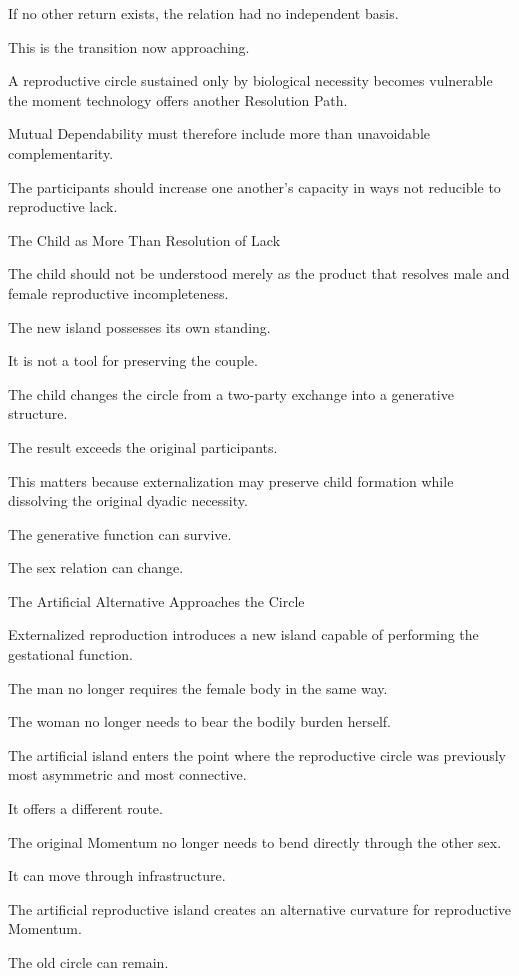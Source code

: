 If no other return exists, the relation had no independent basis.

This is the transition now approaching.

A reproductive circle sustained only by biological necessity becomes vulnerable the moment technology offers another Resolution Path.

Mutual Dependability must therefore include more than unavoidable complementarity.

The participants should increase one another’s capacity in ways not reducible to reproductive lack.

The Child as More Than Resolution of Lack

The child should not be understood merely as the product that resolves male and female reproductive incompleteness.

The new island possesses its own standing.

It is not a tool for preserving the couple.

The child changes the circle from a two-party exchange into a generative structure.

The result exceeds the original participants.

This matters because externalization may preserve child formation while dissolving the original dyadic necessity.

The generative function can survive.

The sex relation can change.

The Artificial Alternative Approaches the Circle

Externalized reproduction introduces a new island capable of performing the gestational function.

The man no longer requires the female body in the same way.

The woman no longer needs to bear the bodily burden herself.

The artificial island enters the point where the reproductive circle was previously most asymmetric and most connective.

It offers a different route.

The original Momentum no longer needs to bend directly through the other sex.

It can move through infrastructure.

The artificial reproductive island creates an alternative curvature for reproductive Momentum.

The old circle can remain.

